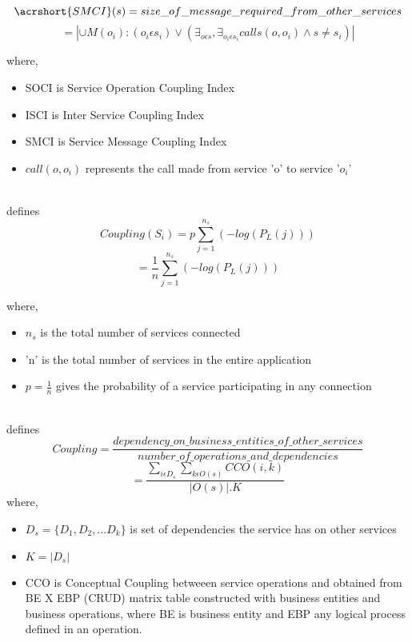 {{$$ \acrshort{SMCI}(s) = size\_of\_message\_required\_from\_other\_services $$ $$ = | \cup M (o_{i}) : ( o_{i} \epsilon s_{i}) \vee ( \exists_{o \epsilon s}, \exists_{o_{i} \epsilon s_{i} } calls(o, o_{i}) \wedge s \neq s_{i} ) | $$

where, \\
\begin{itemize}[leftmargin=.5in]
\item SOCI is Service Operation Coupling Index
\item ISCI is Inter Service Coupling Index
\item SMCI is Service Message Coupling Index
\item $ call(o, o_i) $ represents the call made from service 'o' to service '$o_i$'
\end{itemize}
\\
\cite{Xiao-jun:2015aa} defines 
$$Coupling(S_i) =  p \sum_{j=1}^{n_s} (-log(P_L(j)))$$
$$= \frac{1}{n} \sum_{j=1}^{n_s} (-log(P_L(j)))$$

where, \\
\begin{itemize}[leftmargin=.5in]
\item $n_s$ is the total number of services connected
\item 'n' is the total number of services in the entire application
\item $p = \frac{1}{n}$ gives the probability of a service participating in any connection
\end{itemize}
\\
\cite{Kazemi:2011aa} defines
$$Coupling = \frac{dependency\_on\_business\_entities\_of\_other\_services}{number\_of\_operations\_and\_ dependencies}$$ $$=\frac{\sum_{i \epsilon D_s} \sum_{k \epsilon O(s)}CCO(i,k)}{|O(s)|.K}$$
where, \\
\begin{itemize}[leftmargin=.5in]
\item $D_s = \{ D_1, D_2,...D_k \}$ is set of dependencies the service has on other services
\item $ K = |D_s| $
\item CCO is Conceptual Coupling betweeen service operations and obtained from BE X EBP (CRUD) matrix table constructed with business entities and business operations, where BE is business entity and EBP any logical process defined in an operation.
\end{itemize}

}}
